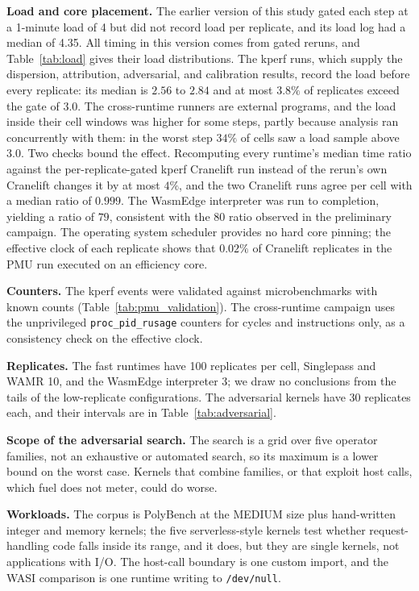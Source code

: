 \documentclass{ws-jcsc}
\begin{document}
\textbf{Load and core placement.} The earlier version of this study gated each step at a 1-minute load of 4 but did not record load per replicate, and its load log had a median of 4.35. All timing in this version comes from gated reruns, and Table~\ref{tab:load} gives their load distributions. The kperf runs, which supply the dispersion, attribution, adversarial, and calibration results, record the load before every replicate: its median is $2.56$ to $2.84$ and at most $3.8\%$ of replicates exceed the gate of $3.0$. The cross-runtime runners are external programs, and the load inside their cell windows was higher for some steps, partly because analysis ran concurrently with them: in the worst step $34\%$ of cells saw a load sample above $3.0$. Two checks bound the effect. Recomputing every runtime's median time ratio against the per-replicate-gated kperf Cranelift run instead of the rerun's own Cranelift changes it by at most $4\%$, and the two Cranelift runs agree per cell with a median ratio of $0.999$. The WasmEdge interpreter was run to completion, yielding a ratio of $79$, consistent with the $80$ ratio observed in the preliminary campaign. The operating system scheduler provides no hard core pinning; the effective clock of each replicate shows that $0.02\%$ of Cranelift replicates in the PMU run executed on an efficiency core.

\textbf{Counters.} The kperf events were validated against microbenchmarks with known counts (Table~\ref{tab:pmu_validation}). The cross-runtime campaign uses the unprivileged \texttt{proc\_pid\_rusage} counters for cycles and instructions only, as a consistency check on the effective clock.

\textbf{Replicates.} The fast runtimes have 100 replicates per cell, Singlepass and WAMR 10, and the WasmEdge interpreter 3; we draw no conclusions from the tails of the low-replicate configurations. The adversarial kernels have 30 replicates each, and their intervals are in Table~\ref{tab:adversarial}.

\textbf{Scope of the adversarial search.} The search is a grid over five operator families, not an exhaustive or automated search, so its maximum is a lower bound on the worst case. Kernels that combine families, or that exploit host calls, which fuel does not meter, could do worse.

\textbf{Workloads.} The corpus is PolyBench at the MEDIUM size plus hand-written integer and memory kernels; the five serverless-style kernels test whether request-handling code falls inside its range, and it does, but they are single kernels, not applications with I/O. The host-call boundary is one custom import, and the WASI comparison is one runtime writing to \texttt{/dev/null}.
\end{document}
